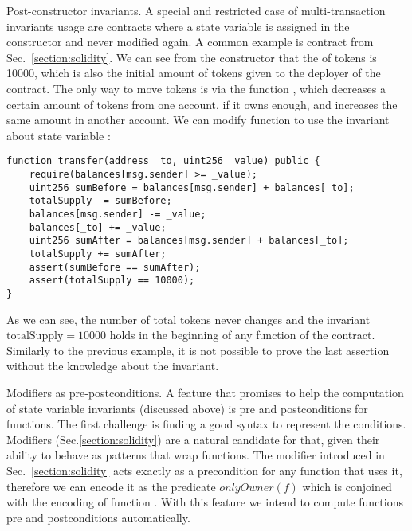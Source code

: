 \begin{paragraph}{Post-constructor invariants.}
A special and restricted case of multi-transaction invariants usage are
contracts where a state variable is assigned in the constructor and never
modified again.
%
A common example is contract  from Sec.~\ref{section:solidity}.
%
We can see from the constructor that the  of tokens is 10000,
which is also the initial amount of tokens given to the deployer of the
contract.
%
The only way to move tokens is via the function , which
decreases a certain amount of tokens from one account, if it owns enough, and
increases the same amount in another account.
%
We can modify function  to use the invariant about state
variable :

\begin{verbatim}
function transfer(address _to, uint256 _value) public {
    require(balances[msg.sender] >= _value);
    uint256 sumBefore = balances[msg.sender] + balances[_to];
    totalSupply -= sumBefore;
    balances[msg.sender] -= _value;
    balances[_to] += _value;
    uint256 sumAfter = balances[msg.sender] + balances[_to];
    totalSupply += sumAfter;
    assert(sumBefore == sumAfter);
    assert(totalSupply == 10000);
}
\end{verbatim}

As we can see, the number of total tokens never changes and the invariant
$\mathrm{totalSupply} = 10000$ holds in the beginning of any function of the
contract.
%
Similarly to the previous example, it is not possible to prove the last
assertion without the knowledge about the invariant.


\end{paragraph}

\begin{paragraph}{Modifiers as pre-postconditions.}
A feature that promises to help the computation of state variable invariants
(discussed above) is pre and postconditions for functions.
%
The first challenge is finding a good syntax to represent the conditions.
%
Modifiers (Sec.\ref{section:solidity}) are a natural candidate for that, given
their ability to behave as patterns that wrap functions.
%
The modifier  introduced in Sec.~\ref{section:solidity} acts
exactly as a precondition for any function that uses it, therefore we can
encode it as the predicate $onlyOwner(f)$ which is conjoined with the encoding
of function .
%
With this feature we intend to compute functions pre and postconditions
automatically.
\end{paragraph}

